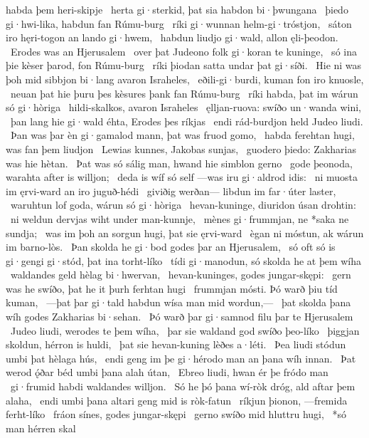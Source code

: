 habda þem heri-skipje \hld\ herta gi·sterkid,
þat sia habdon bi·þwungana \hld\ þiedo gi·hwi-lika,
habdun fan Rúmu-burg \hld\ ríki gi·wunnan
helm-gi·tróstjon, \hld\ sáton iro hęri-togon
an lando gi·hwem, \hld\ habdun liudjo gi·wald,
allon ęli-þeodon. \hld\ Erodes was
an Hjerusalem \hld\ over þat Judeono folk
gi·koran te kuninge, \hld\ só ina þie kèser þarod,
fon Rúmu-burg \hld\ ríki þiodan
satta undar þat gi·síði. \hld\ Hie ni was þoh mid sibbjon bi·lang
avaron Israheles, \hld\ eðili-gi·burdi,
kuman fon iro knuosle, \hld\ neuan þat hie þuru þes kèsures þank
fan Rúmu-burg \hld\ ríki habda,
þat im wárun só gi·hòriga \hld\ hildi-skalkos,
avaron Israheles \hld\ ęlljan-ruova:
swíðo un·wanda wini, \hld\ þan lang hie gi·wald éhta,
Erodes þes ríkjas \hld\ endi rád-burdjon held
Judeo liudi. \hld\ Þan was þar èn gi·gamalod mann,
þat was fruod gomo, \hld\ habda ferehtan hugi,
was fan þem liudjon \hld\ Lewias kunnes,
Jakobas sunjas, \hld\ guodero þiedo:
Zakharias was hie hètan. \hld\ Þat was só sálig man,
hwand hie simblon gerno \hld\ gode þeonoda,
warahta after is willjon; \hld\ deda is wíf só self
—was iru gi·aldrod idis: \hld\ ni muosta im ęrvi-ward
an iro juguð-hédi \hld\ giviðig werðan—
libdun im far·úter laster, \hld\ waruhtun lof goda,
wárun só gi·hòriga \hld\ hevan-kuninge,
diuridon úsan drohtin: \hld\ ni weldun dervjas wiht
under man-kunnje, \hld\ mènes gi·frummjan,
ne *saka ne sundja; \hld\ was im þoh an sorgun hugi,
þat sie ęrvi-ward \hld\ ègan ni móstun,
ak wárun im barno-lòs. \hld\ Þan skolda he gi·bod godes
þar an Hjerusalem, \hld\ só oft só is gi·gengi gi·stód,
þat ina torht-líko \hld\ tídi gi·manodun,
só skolda he at þem wíha \hld\ waldandes geld
hèlag bi·hwervan, \hld\ hevan-kuninges,
godes jungar-skępi: \hld\ gern was he swíðo,
þat he it þurh ferhtan hugi \hld\ frummjan mósti.
Þó warð þiu tíd kuman, \hld\ —þat þar gi·tald habdun %
wísa man mid wordun,— \hld\ þat skolda þana wíh godes
Zakharias bi·sehan. \hld\ Þó warð þar gi·samnod filu
þar te Hjerusalem \hld\ Judeo liudi,
werodes te þem wíha, \hld\ þar sie waldand god
swíðo þeo-líko \hld\ þiggjan skoldun,
hérron is huldi, \hld\ þat sie hevan-kuning
lèðes a·léti. \hld\ Þea liudi stódun
umbi þat hèlaga hús, \hld\ endi geng im þe gi·hérodo man
an þana wíh innan. \hld\ Þat werod ǫ́ðar béd
umbi þana alah útan, \hld\ Ebreo liudi,
hwan ér þe fródo man \hld\ gi·frumid habdi
waldandes willjon. \hld\ Só he þó þana wí-ròk dróg,
ald aftar þem alaha, \hld\ endi umbi þana altari geng
mid is ròk-fatun \hld\ ríkjun þionon,
—fremida ferht-líko \hld\ fráon sínes,
godes jungar-skępi \hld\ gerno swíðo
mid hluttru hugi, \hld\ *só man hérren skal
